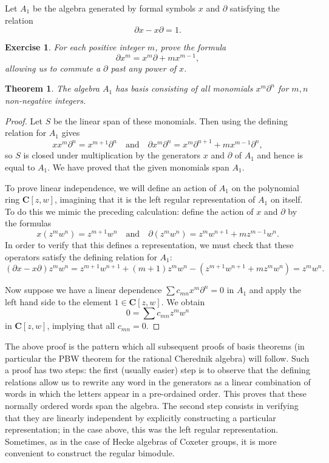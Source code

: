 \documentclass[12pt, reqno]{amsart}
\numberwithin{equation}{section}
\theoremstyle{definition}
\theoremstyle{plain}
\newtheorem{theorem}{Theorem}[section]
\newtheorem{exercise}{Exercise}
\newcommand{\CC}{\mathbf{C}}
\begin{document}
Let $A_1$ be the algebra generated by formal symbols $x$ and $\partial$ satisfying the relation
$$\partial x - x \partial=1.$$ 
\begin{exercise}
For each positive integer $m$, prove the formula
$$\partial x^m=x^m \partial+m x^{m-1},$$ allowing us to commute a $\partial$ past any power of $x$.
\end{exercise}
\begin{theorem}
The algebra $A_1$ has basis consisting of all monomials $x^m \partial^n$ for $m,n$ non-negative integers.\end{theorem}
\begin{proof}
Let $S$ be the linear span of these monomials. Then using the defining relation for $A_1$ gives
$$x x^m \partial^n=x^{m+1} \partial^n \quad \text{and} \quad \partial x^m \partial^n=x^m \partial^{n+1}+mx^{m-1} \partial^n,$$ so $S$ is closed under multiplication by the generators $x$ and $\partial$ of $A_1$ and hence is equal to $A_1$. We have proved that the given monomials span $A_1$.

To prove linear independence, we will define an action of $A_1$ on the polynomial ring $\CC[z,w]$, imagining that it is the left regular representation of $A_1$ on itself. To do this we mimic the preceding calculation: define the action of $x$ and $\partial$ by the formulas
$$x (z^m w^n)=z^{m+1}w^{n} \quad \text{and} \quad \partial (z^m w^n)=z^m w^{n+1}+m z^{m-1} w^n.$$ In order to verify that this defines a representation, we must check that these operators satisfy the defining relation for $A_1$:
$$(\partial x - x \partial) z^m w^n=z^{m+1} w^{n+1}+(m+1) z^m w^n-(z^{m+1} w^{n+1}+m z^m w^n)=z^m w^n.$$ 

Now suppose we have a linear dependence $\sum c_{mn} x^m \partial^n=0$ in $A_1$ and apply the left hand side to the element $1 \in \CC[z,w]$. We obtain
$$0=\sum c_{mn} z^m w^n$$ in $\CC[z,w]$, implying that all $c_{mn}=0$.
\end{proof} The above proof is the pattern which all subsequent proofs of basis theorems (in particular the PBW theorem for the rational Cherednik algebra) will follow. Such a proof has two steps: the first (usually easier) step is to observe that the defining relations allow us to rewrite any word in the generators as a linear combination of words in which the letters appear in a pre-ordained order. This proves that these normally ordered words span the algebra. The second step consists in verifying that they are linearly independent by explicitly constructing a particular representation; in the case above, this was the left regular representation. Sometimes, as in the case of Hecke algebras of Coxeter groups, it is more convenient to construct the regular bimodule.
\end{document}
